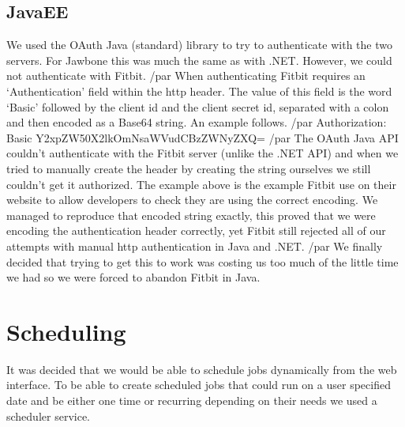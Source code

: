 \subsection{JavaEE}
We used the OAuth Java (standard) library to try to authenticate with the two servers. For Jawbone this was much the same as with .NET. However, we could not authenticate with Fitbit. /par
When authenticating Fitbit requires an ‘Authentication’ field within the http header. The value of this field is the word ‘Basic’ followed by the client id and the client secret id, separated with a colon and then encoded as a Base64 string. An example follows. /par
Authorization: Basic Y2xpZW50X2lkOmNsaWVudCBzZWNyZXQ= /par
The OAuth Java API couldn’t authenticate with the Fitbit server (unlike the .NET API) and when we tried to manually create the header by creating the string ourselves we still couldn’t get it authorized. The example above is the example Fitbit use on their website to allow developers to check they are using the correct encoding. We managed to reproduce that encoded string exactly, this proved that we were encoding the authentication header correctly, yet Fitbit still rejected all of our attempts with manual http authentication in Java and .NET. /par
We finally decided that trying to get this to work was costing us too much of the little time we had so we were forced to abandon Fitbit in Java.
\section{Scheduling}
It was decided that we would be able to schedule jobs dynamically from the web interface. To be able to create scheduled jobs that could run on a user specified date and be either one time or recurring depending on their needs we used a scheduler service. 
